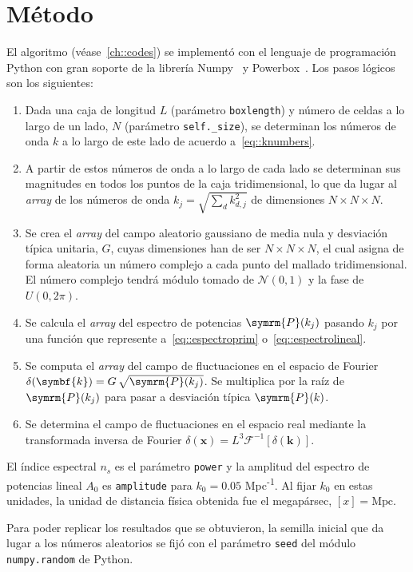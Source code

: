 \section{Método}\label{sec::metodo}
El algoritmo (véase~\autoref{ch::codes}) se implementó con el lenguaje de programación Python con gran soporte de la librería Numpy~\cite{harris2020array} y Powerbox~\cite{Murray2018}. Los pasos lógicos son los siguientes:
\begin{enumerate}
    \item Dada una caja de longitud \(L\) (parámetro \texttt{boxlength}) y número de celdas a lo largo de un lado, \(N\) (parámetro \texttt{self.\_size}), se determinan los números de onda \(k\) a lo largo de este lado de acuerdo a~\eqref{eq::knumbers}.
    \item A partir de estos números de onda a lo largo de cada lado se determinan sus magnitudes en todos los puntos de la caja tridimensional, lo que da lugar al \textit{array} de los números de onda \(k_j=\sqrt{\sum_d k^2_{d,j}}\) de dimensiones \(N\times N\times N\).
    \item Se crea el \textit{array} del campo aleatorio gaussiano de media nula y desviación típica unitaria, \(G\), cuyas dimensiones han de ser \(N\times N\times N\), el cual asigna de forma aleatoria un número complejo a cada punto del mallado tridimensional. El número complejo tendrá módulo tomado de \(\mathcal{N}(0,1)\) y la fase de \(U(0,2\pi)\).
    \item Se calcula el \textit{array} del espectro de potencias \(\symrm{P}(k_j)\) pasando \(k_j\) por una función que represente a~\eqref{eq::espectroprim} o~\eqref{eq::espectrolineal}.
    \item Se computa el \textit{array} del campo de fluctuaciones en el espacio de Fourier \(\delta(\symbf{k})=G\,\sqrt{\symrm{P}(k_j)}\). Se multiplica por la raíz de \(\symrm{P}(k_j)\) para pasar a desviación típica \(\symrm{P}(k)\).
    \item Se determina el campo de fluctuaciones en el espacio real mediante la transformada inversa de Fourier \(\delta(\symbf{x})=L^3\mathcal{F}^{-1}\left[\delta(\symbf{k})\right]\).
\end{enumerate}
El índice espectral \(n_s\) es el parámetro \texttt{power} y la amplitud del espectro de potencias lineal \(A_0\) es \texttt{amplitude} para \(k_0=0.05\) Mpc\textsuperscript{-1}. Al fijar \(k_0\) en estas unidades, la unidad de distancia física obtenida fue el megapársec, \([x]=\text{Mpc}\).

Para poder replicar los resultados que se obtuvieron, la semilla inicial que da lugar a los números aleatorios se fijó con el parámetro \texttt{seed} del módulo \texttt{numpy.random} de Python.
